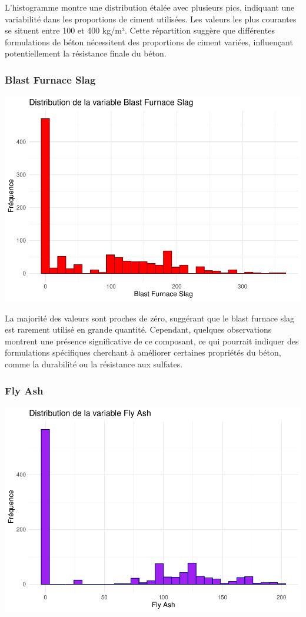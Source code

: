 \documentclass[
  12pt,
]{article}
\begin{document}
L'histogramme montre une distribution étalée avec plusieurs pics,
indiquant une variabilité dans les proportions de ciment utilisées. Les
valeurs les plus courantes se situent entre 100 et 400 kg/m³. Cette
répartition suggère que différentes formulations de béton nécessitent
des proportions de ciment variées, influençant potentiellement la
résistance finale du béton.

\subsubsection{Blast Furnace Slag}\label{blast-furnace-slag}

\includegraphics{rmd_final_files/figure-latex/unnamed-chunk-2-1.pdf}

La majorité des valeurs sont proches de zéro, suggérant que le blast
furnace slag est rarement utilisé en grande quantité. Cependant,
quelques observations montrent une présence significative de ce
composant, ce qui pourrait indiquer des formulations spécifiques
cherchant à améliorer certaines propriétés du béton, comme la durabilité
ou la résistance aux sulfates.

\subsubsection{Fly Ash}\label{fly-ash}

\includegraphics{rmd_final_files/figure-latex/unnamed-chunk-3-1.pdf}
\end{document}
